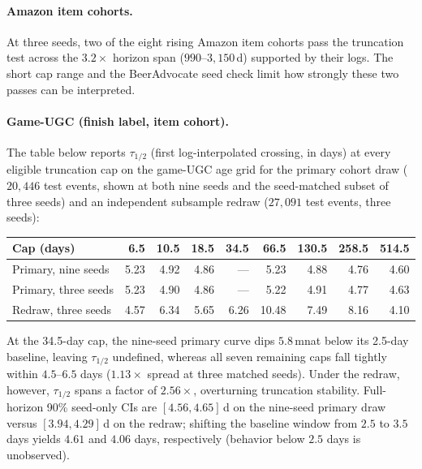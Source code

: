 \documentclass[10pt,letterpaper]{article}
\begin{document}
\paragraph{Amazon item cohorts.}
At three seeds, two of the eight rising Amazon item cohorts pass the truncation
test across the $3.2\times$ horizon span ($990$--$3{,}150$\,d) supported by
their logs. The short cap range and the BeerAdvocate seed check limit how
strongly these two passes can be interpreted.

\paragraph{Game-UGC (finish label, item cohort).}
The table below reports $\tau_{1/2}$ (first log-interpolated crossing, in days)
at every eligible truncation cap on the game-UGC age grid for the primary cohort
draw ($20{,}446$ test events, shown at both nine seeds and the seed-matched
subset of three seeds) and an independent subsample redraw ($27{,}091$ test
events, three seeds):
\begin{center}\small
\setlength{\tabcolsep}{3.5pt}
\begin{tabular}{lrrrrrrrr}
\toprule
Cap (days) & 6.5 & 10.5 & 18.5 & 34.5 & 66.5 & 130.5 & 258.5 & 514.5\\
\midrule
Primary, nine seeds & 5.23 & 4.92 & 4.86 & --- & 5.23 & 4.88 & 4.76 & 4.60\\
Primary, three seeds & 5.23 & 4.90 & 4.86 & --- & 5.22 & 4.91 & 4.77 & 4.63\\
Redraw, three seeds & 4.57 & 6.34 & 5.65 & 6.26 & 10.48 & 7.49 & 8.16 & 4.10\\
\bottomrule
\end{tabular}
\end{center}
At the 34.5-day cap, the nine-seed primary curve dips $5.8$\,mnat below its
2.5-day baseline, leaving $\tau_{1/2}$ undefined, whereas all seven remaining
caps fall tightly within $4.5$--$6.5$ days ($1.13\times$ spread at three matched
seeds). Under the redraw, however, $\tau_{1/2}$ spans a factor of $2.56\times$,
overturning truncation stability. Full-horizon 90\% seed-only CIs are
$[4.56, 4.65]$\,d on the nine-seed primary draw versus $[3.94, 4.29]$\,d on the
redraw; shifting the baseline window from $2.5$ to $3.5$ days yields $4.61$ and
$4.06$ days, respectively (behavior below $2.5$ days is unobserved).
\end{document}
